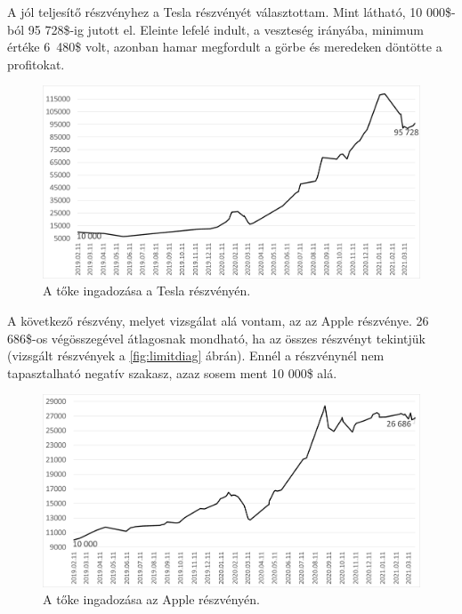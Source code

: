 A jól teljesítő részvényhez a Tesla részvényét választottam. Mint látható, 10 000\$-ból 95 728\$-ig jutott el. Eleinte lefelé indult, a veszteség irányába, minimum értéke \mbox{6 480\$} volt, azonban hamar megfordult a görbe és meredeken döntötte a profitokat.
\begin{figure}[ht]
\centering
\includegraphics[scale=0.47]{images/TSLA_MONEY.png}
\caption{A tőke ingadozása a Tesla részvényén.}
\label{fig:TSLA_MONEY}
\end{figure}

A következő részvény, melyet vizsgálat alá vontam, az az Apple részvénye. 26 686\$-os végösszegével átlagosnak mondható, ha az összes részvényt tekintjük (vizsgált részvények a \ref{fig:limitdiag} ábrán). Ennél a részvénynél nem tapasztalható negatív szakasz, azaz sosem ment 10 000\$ alá.
\begin{figure}[ht]
\centering
\includegraphics[scale=0.47]{images/AAPL_MONEY.png}
\caption{A tőke ingadozása az Apple részvényén.}
\label{fig:AAPL_MONEY}
\end{figure}

